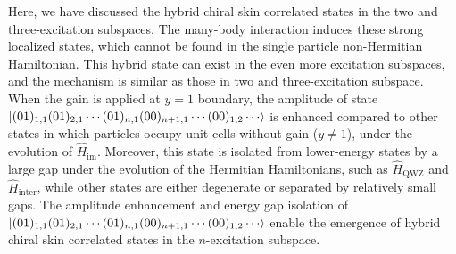 \documentclass[longbibliography, aps, prx, amsmath, amssymb, amsfonts, twocolumn,superscriptaddress, footinbib]{revtex4-1}
\begin{document}
	Here, we have discussed the hybrid chiral skin correlated states in the two and three-excitation subspaces. The many-body interaction induces these strong localized states, which cannot be found in the single particle non-Hermitian Hamiltonian. This hybrid state can exist in the even more excitation subspaces, and the mechanism is similar as those in two and three-excitation subspace. 
	When the gain is applied at $y=1$ boundary, the amplitude of state $\ket{(01)_{1,1}(01)_{2,1}\cdots(01)_{n,1}(00)_{n+1,1}\cdots(00)_{1,2}\cdots}$ is enhanced compared to other states in which particles occupy unit cells without gain ($y\neq 1$), under the evolution of $\hat{H}_{\text{im}}$. Moreover, this state is isolated from lower-energy states by a large gap under the evolution of the Hermitian Hamiltonians, such as $\hat{H}_{\text{QWZ}}$ and $\hat{H}_{\text{inter}}$, while other states are either degenerate or separated by relatively small gaps. The amplitude enhancement and energy gap isolation of $\ket{(01)_{1,1}(01)_{2,1}\cdots(01)_{n,1}(00)_{n+1,1}\cdots(00)_{1,2}\cdots}$ enable the emergence of hybrid chiral skin correlated states in the $n$-excitation subspace. 
\end{document}
